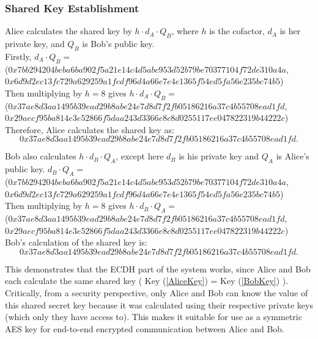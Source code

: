 \documentclass[12pt,a4paper]{article}
\begin{document}
\subsubsection{Shared Key Establishment} \noindent
Alice calculates the shared key by $h \cdot d_A \cdot Q_B$, 
where $h$ is the cofactor, $d_A$ is her private key, and $Q_B$ is Bob's public key. \\
Firstly, $d_A \cdot Q_B = $\\
({\footnotesize $0x7bb294204beba6ba902f5a21e14c4d5abc953d52b79be70377104f72de310a4a$}, \\
{\footnotesize $0x6d9d2ec13fc729a629259a1fcdf96d4a66e7e4e1365f54ed5fa56e235bc74b5$}) \\
Then multiplying by $h = 8$ gives $h \cdot d_A \cdot Q_B = $\\
({\footnotesize $0x37ae8d3aa1495b39ead29b8abe24e7d8d7f2fb05186216a37c4b55708ead1fd$}, \\
{\footnotesize $0x29aecf95ba814e3e52866f5daa243d3366e8c8d0255117ee047822319b44222c$}) \\
Therefore, Alice calculates the shared key as: 
\begin{equation} \label{AliceKey}
    0x37ae8d3aa1495b39ead29b8abe24e7d8d7f2fb05186216a37c4b55708ead1fd.
\end{equation}

Bob also calculates $h \cdot d_B \cdot Q_A$, except here $d_B$ is his private key and $Q_A$ is Alice's public key. 
$d_B \cdot Q_A = $ \\
({\footnotesize $0x7bb294204beba6ba902f5a21e14c4d5abc953d52b79be70377104f72de310a4a$}, \\
{\footnotesize $0x6d9d2ec13fc729a629259a1fcdf96d4a66e7e4e1365f54ed5fa56e235bc74b5$}) \\
Then multiplying by $h = 8$ gives $h \cdot d_B \cdot Q_A = $\\
({\footnotesize $0x37ae8d3aa1495b39ead29b8abe24e7d8d7f2fb05186216a37c4b55708ead1fd$}, \\
{\footnotesize $0x29aecf95ba814e3e52866f5daa243d3366e8c8d0255117ee047822319b44222c$}) \\
Bob's calculation of the shared key is: 
\begin{equation} \label{BobKey}
    0x37ae8d3aa1495b39ead29b8abe24e7d8d7f2fb05186216a37c4b55708ead1fd.
\end{equation}

This demonstrates that the ECDH part of the system works, since Alice and Bob each calculate the same shared key ( Key (\ref{AliceKey}) = Key (\ref{BobKey}) ). 
Critically, from a security perspective, only Alice and Bob can know the value of this shared secret key 
because it was calculated using their respective private keys (which only they have access to). 
This makes it suitable for use as a symmetric AES key for end-to-end encrypted communication between Alice and Bob. 
\end{document}
